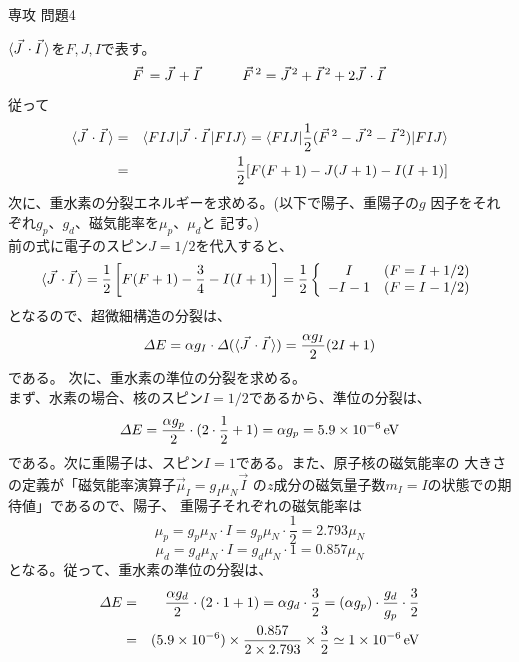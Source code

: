 \documentclass[fleqn]{jbook}
\begin{document}
\begin{answer}{専攻 問題4}{}
\begin{subanswers}
\begin{subsubanswers}
  \SubSubAnswer
    $\langle{\vec{J}\,\cdot\vec{I}\,}\rangle$を$F,J,I$で表す。
%
    \[ \Vec{F} = \Vec{J}+\Vec{I} \hspace{10mm}%
       \Vec{F}^2 = \Vec{J}^2+\Vec{I}^2+2\Vec{J}\cdot\Vec{I} \]
%
    従って
%
    \begin{eqnarray*}
      \Mean{\Vec{J}\cdot\Vec{I}}%
      &=& \Bracket{FIJ}{\Vec{J}\cdot\Vec{I}}{FIJ}%
       =  \Bracket{FIJ}{\frac{1}{2}(\Vec{F}^2-\Vec{J}^2-\Vec{I}^2)}{FIJ} \\
      &=& \frac{1}{2}[F(F+1)-J(J+1)-I(I+1)]
    \end{eqnarray*}
%
    次に、重水素の分裂エネルギーを求める。(以下で陽子、重陽子の$g$
    因子をそれぞれ$g_p$、$g_d$、磁気能率を$\mu_{p}$、$\mu_{d}$と
    記す。)\\
%
    前の式に電子のスピン$J=1/2$を代入すると、
%
    \[ \Mean{\Vec{J}\cdot\Vec{I}}%
       = \frac{1}{2}\left[F(F+1)-\frac{3}{4}-I(I+1)\right]
       = \frac{1}{2}\left\{\begin{array}{cc}
                     I   & (F=I+1/2) \\
                    -I-1 & (F=I-1/2) \end{array}\right. \]
%
    となるので、超微細構造の分裂は、
%
    \[ \IDelta E%
       = \alpha g_{I}\cdot\IDelta(\Mean{\Vec{J}\cdot\Vec{I}})%
       = \frac{\alpha g_{I}}{2}(2I+1) \]
%
    である。
\newpage
    次に、重水素の準位の分裂を求める。\\
    まず、水素の場合、核のスピン$I=1/2$であるから、準位の分裂は、
%
    \[ \IDelta E%
       = \frac{\alpha g_{p}}{2}\cdot(2\cdot\frac{1}{2}+1)%
       = \alpha g_{p}%
       = 5.9\Keta{-6}\Unit{eV} \]
%
    である。次に重陽子は、スピン$I=1$である。また、原子核の磁気能率の
    大きさの定義が「磁気能率演算子$\Vec{\mu}_{I}=g_{I}\mu_{N}\Vec{I}$
    の$z$成分の磁気量子数$m_{I}=I$の状態での期待値」であるので、陽子、
    重陽子それぞれの磁気能率は
%
    \[ \mu_{p} = g_{p} \mu_{N} \cdot I%
               = g_{p} \mu_{N}\cdot\frac{1}{2} =2.793 \mu_{N}  \]
    \[ \mu_{d} = g_{d} \mu_{N} \cdot I
               = g_{d} \mu_{N} \cdot 1  = 0.857 \mu_{N}\]
%
    となる。従って、重水素の準位の分裂は、
%
    \begin{eqnarray*}
      \IDelta E%
        &=& \frac{\alpha g_{d}}{2} \cdot(2\cdot1+1)%
         =  \alpha g_{d}\cdot \frac{3}{2}%
         =  (\alpha g_{p})\cdot\frac{g_{d}}{g_{p}}\cdot\frac{3}{2} \\
        &=& (5.9\Keta{-6})\times\frac{0.857}{2\times 2.793}\times%
            \frac{3}{2}
        \simeq 1\Keta{-6} \Unit{eV}
    \end{eqnarray*}


\end{subsubanswers}
\end{subanswers}
\end{answer}
\end{document}
